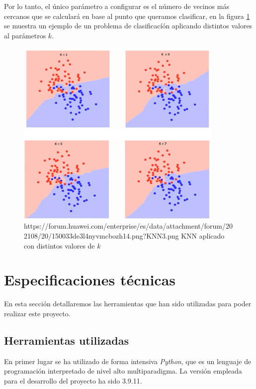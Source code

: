                 Por lo tanto, el único parámetro a configurar es el número de vecinos más cercanos que se calculará en base al punto que queramos clasificar, en la figura \ref{KNNImage} se muestra un ejemplo de un problema de clasificacíón aplicando distintos valores al parámetros $k$.

                \begin{figure}[h]
                    \centering
                    \includegraphics[width=10cm]{archivos/3.Tecnologias/KNN/KNNImage}
                    \caption{https://forum.huawei.com/enterprise/es/data/attachment/forum/202108/20/150033de3l4nyvmcbozh14.png?KNN3.png KNN aplicado con distintos valores de $k$}
                    \label{KNNImage}
                \end{figure}

            

    \section{Especificaciones técnicas}

        En esta sección detallaremos las herramientas que han sido utilizadas para poder realizar este proyecto.


        \subsection{Herramientas utilizadas}
            En primer lugar se ha utilizado de forma intensiva \textit{Python}, que es un lenguaje de programación interpretado de nivel alto multiparadigma. La versión empleada para el desarrollo del proyecto ha sido 3.9.11. \cite{Python}
            
